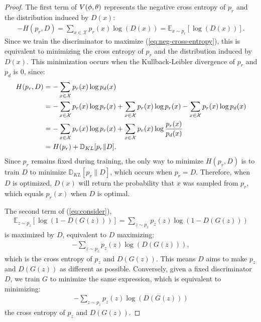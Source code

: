 \begin{proof}
	The first term of $V(\phi, \theta)$ represents the negative cross entropy of $p_r$ and
	the distribution induced by $D(x)$:
	\begin{align}
		\label{eq:neg-cross-entropy}
		- H(p_r, D) = \sum_{x \in \mathcal{X}}p_r(x)\log(D(x)) = \mathbb{E}_{x \sim p_r} \left[\log(D(x))\right].
	\end{align}
	Since we train the discriminator to maximize
	(\ref{eq:neg-cross-entropy}), this is equivalent to minimizing the cross entropy of $p_r$
	and the distribution induced by $D(x)$. This minimization occurs when the
	Kullback-Leibler divergence of $p_r$ and $p_d$ is 0, since:
	\begin{align}
		H(p_r,D) & = - \sum_{x \in \mathcal{X}} p_r(x) \log p_d(x)                                                                                            \\
		         & = -\sum_{x \in \mathcal{X}} p_r(x) \log p_r(x) + \sum_{x \in \mathcal{X}} p_r(x) \log p_r(x) - \sum_{x \in \mathcal{X}} p_r(x) \log p_d(x) \\
		         & = -\sum_{x \in \mathcal{X}} p_r(x) \log p_r(x) + \sum_{x \in \mathcal{X}} p_r(x) \log {p_r(x) \over
		p_d(x)}                                                                                                                                               \\
		         & = H(p_r) + \mathbb{D}_{KL}[p_r \| D].
	\end{align}
	Since $p_r$ remains fixed during training, the only way to minimize
	$H(p_r,D)$ is to train $D$ to minimize $\mathbb{D}_{KL}[p_r \| D]$, which occurs when
	$p_r = D$. Therefore, when $D$ is optimized, $D(x)$ will return the probability that $x$ was sampled from $p_r$, which equals $p_r(x)$ when $D$ is optimal.

	The second term of (\ref{eq:consider}),
	\begin{align}
		\mathbb{E}_{z \sim p_z}\left[\log(1 - D(G(z)))\right] =
		\sum_{z \sim p_z} p_z(z) \log (1 - D(G(z)))
	\end{align}
	is maximized by $D$, equivalent to $D$ maximizing:
	\begin{align}
		-\sum_{z \sim p_z} p_z(z) \log (D(G(z))),
	\end{align}
	which is the cross entropy of $p_z$ and $D(G(z))$. This means $D$ aims to make $p_z$ and $D(G(z))$ as different as possible. Conversely, given a fixed discriminator $D$, we train $G$ to minimize the same expression, which is equivalent to minimizing:
	\begin{align}
		-\sum_{z \sim p_z} p_z(z) \log (D(G(z)))
	\end{align}
	the cross entropy of $p_z$ and $D(G(z))$.
\end{proof}

